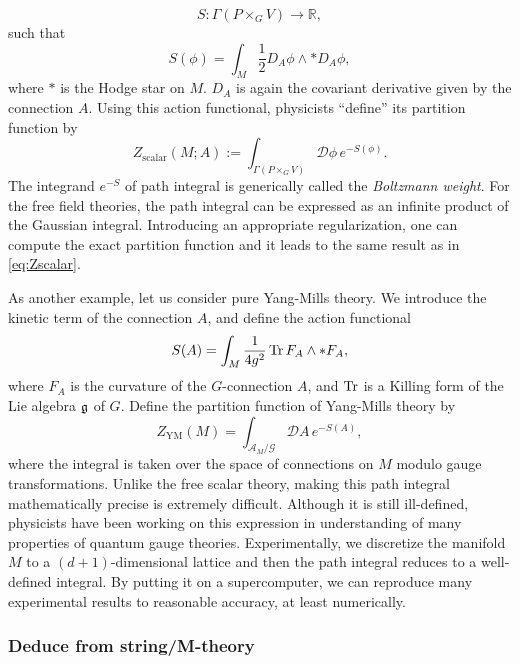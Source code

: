 \begin{equation}
  S  :  \Gamma(P\times_{G}V)  \longrightarrow  \mathbb{R},
\end{equation}
such that
\begin{equation}
  S(\phi)  =  \int_{M}\frac{1}{2}D_{A}\phi\wedge\ast D_{A}\phi,
\end{equation}
where $*$ is the Hodge star on $M$. $D_{A}$ is again the covariant
derivative given by the connection $A$. Using this action functional,
physicists ``define'' its partition function by
\begin{equation}
Z_{\mathrm{scalar}}(M;A) := \int_{\Gamma(P\times_{G}V)}\mathcal{D}\phi\,e^{-S(\phi)}.
\end{equation}
The integrand $e^{-S}$ of path integral is generically called the
\emph{Boltzmann weight}. For the free field theories, the path integral
can be expressed as an infinite product of the Gaussian integral.
Introducing an appropriate regularization, one can compute the exact
partition function and it leads to the same result as in \eqref{eq:Zscalar}.

As another example, let us consider pure Yang-Mills theory. We introduce
the kinetic term of the connection $A$, and define the action functional
\begin{equation}
  S(A)  =  \int_{M}\frac{1}{4g^{2}} \mathop{\mathrm{Tr}}\nolimits F_{A}\wedge*F_{A},
\end{equation}
where $F_{A}$ is the curvature of the $G$-connection $A$,
and $\mathop{\mathrm{Tr}}\nolimits$ is a Killing form of the Lie algebra $\mathfrak{g}$ of $G$. Define
the partition function of Yang-Mills theory by
\begin{equation}
  Z_{\mathrm{YM}}(M)  =  \int_{\mathcal{A}_{M}/\mathcal{G}}\mathcal{D}A\,e^{-S(A)},
\end{equation}
where the integral is taken over the space of connections on $M$
modulo gauge transformations. Unlike the free scalar theory, making
this path integral mathematically precise is extremely difficult.
Although it is still ill-defined, physicists have been working
on this expression in understanding of many properties of quantum gauge
theories. Experimentally, we discretize the manifold $M$
to a $(d+1)$-dimensional lattice and
then the path integral reduces to a well-defined integral.
By putting it on a supercomputer,
we can reproduce many experimental results
to reasonable accuracy, at least numerically.

\subsubsection*{Deduce from string/M-theory}

